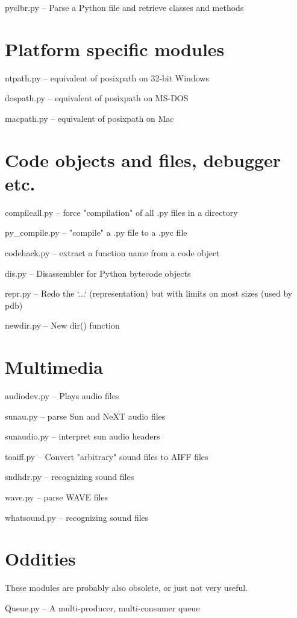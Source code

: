 pyclbr.py -- Parse a Python file and retrieve classes and methods


\section{Platform specific modules}

ntpath.py -- equivalent of posixpath on 32-bit Windows

dospath.py -- equivalent of posixpath on MS-DOS

macpath.py -- equivalent of posixpath on Mac


\section{Code objects and files, debugger etc.}

compileall.py -- force "compilation" of all .py files in a directory

py_compile.py -- "compile" a .py file to a .pyc file

codehack.py -- extract a function name from a code object

dis.py -- Disassembler for Python bytecode objects

repr.py -- Redo the `...` (representation) but with limits on most
sizes (used by pdb)

newdir.py -- New dir() function


\section{Multimedia}

audiodev.py -- Plays audio files

sunau.py -- parse Sun and NeXT audio files

sunaudio.py -- interpret sun audio headers

toaiff.py -- Convert "arbitrary" sound files to AIFF files

sndhdr.py -- recognizing sound files

wave.py -- parse WAVE files

whatsound.py -- recognizing sound files


\section{Oddities}

These modules are probably also obsolete, or just not very useful.

Queue.py -- A multi-producer, multi-consumer queue

